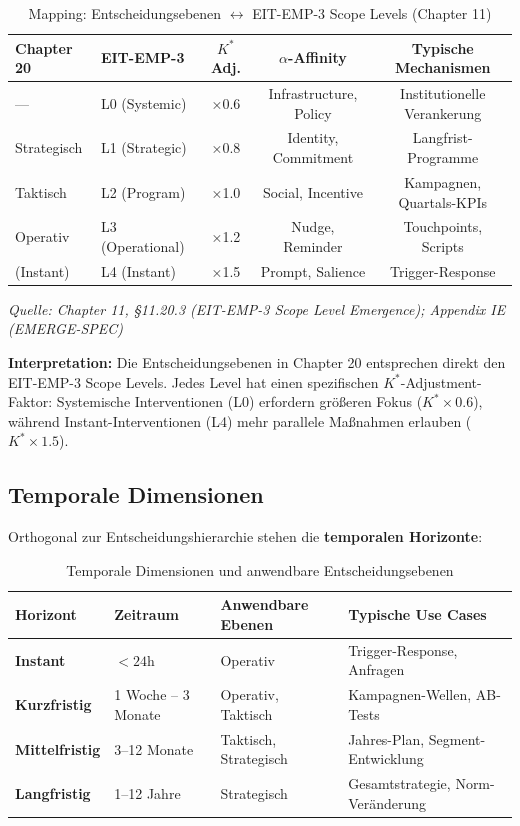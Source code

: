 \begin{table}[htbp]
\centering
\caption{Mapping: Entscheidungsebenen $\leftrightarrow$ EIT-EMP-3 Scope Levels (Chapter 11)}
\label{tab:20-scope-mapping}
\renewcommand{\arraystretch}{1.4}
\small
\begin{tabular}{@{}llccc@{}}
\toprule
\textbf{Chapter 20} & \textbf{EIT-EMP-3} & \textbf{$K^*$ Adj.} & \textbf{$\alpha$-Affinity} & \textbf{Typische Mechanismen} \\
\midrule
--- & L0 (Systemic) & ×0.6 & Infrastructure, Policy & Institutionelle Verankerung \\
Strategisch & L1 (Strategic) & ×0.8 & Identity, Commitment & Langfrist-Programme \\
Taktisch & L2 (Program) & ×1.0 & Social, Incentive & Kampagnen, Quartals-KPIs \\
Operativ & L3 (Operational) & ×1.2 & Nudge, Reminder & Touchpoints, Scripts \\
(Instant) & L4 (Instant) & ×1.5 & Prompt, Salience & Trigger-Response \\
\bottomrule
\end{tabular}

\vspace{0.2cm}
\footnotesize
\textit{Quelle: Chapter 11, §11.20.3 (EIT-EMP-3 Scope Level Emergence); Appendix IE (EMERGE-SPEC)}
\end{table}

\textbf{Interpretation:} Die Entscheidungsebenen in Chapter 20 entsprechen direkt den EIT-EMP-3 Scope Levels. Jedes Level hat einen spezifischen $K^*$-Adjustment-Faktor: Systemische Interventionen (L0) erfordern größeren Fokus ($K^* \times 0.6$), während Instant-Interventionen (L4) mehr parallele Maßnahmen erlauben ($K^* \times 1.5$).

\subsection{Temporale Dimensionen}
\label{sec:20-temporal-dimensions}

Orthogonal zur Entscheidungshierarchie stehen die \textbf{temporalen Horizonte}:

\begin{table}[htbp]
\centering
\caption{Temporale Dimensionen und anwendbare Entscheidungsebenen}
\label{tab:20-temporal-dimensions}
\renewcommand{\arraystretch}{1.4}
\small
\begin{tabular}{@{}llll@{}}
\toprule
\textbf{Horizont} & \textbf{Zeitraum} & \textbf{Anwendbare Ebenen} & \textbf{Typische Use Cases} \\
\midrule
\textbf{Instant} & $< 24$h & Operativ & Trigger-Response, Anfragen \\
\textbf{Kurzfristig} & 1 Woche -- 3 Monate & Operativ, Taktisch & Kampagnen-Wellen, AB-Tests \\
\textbf{Mittelfristig} & 3--12 Monate & Taktisch, Strategisch & Jahres-Plan, Segment-Entwicklung \\
\textbf{Langfristig} & 1--12 Jahre & Strategisch & Gesamtstrategie, Norm-Veränderung \\
\bottomrule
\end{tabular}
\end{table}

